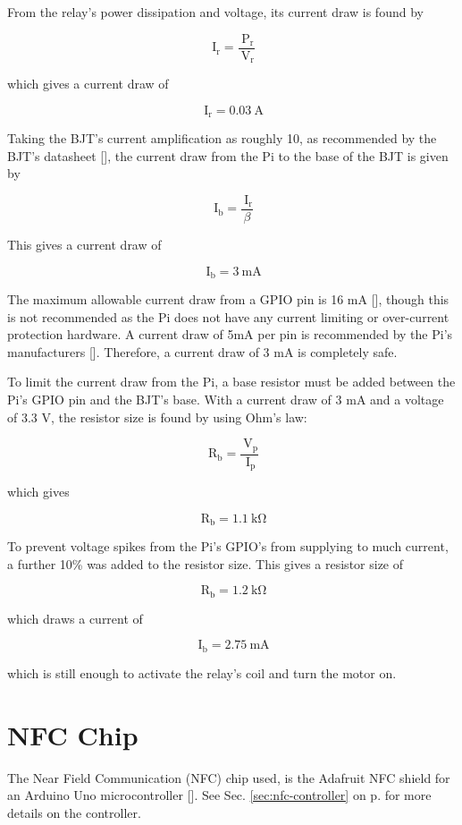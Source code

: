 From the relay's power dissipation and voltage, its current draw is found by

\[
\mathrm{\ I_{r}} = \frac{\mathrm{\ P_{r}}}{\mathrm{\ V_{r}}}
\]

which gives a current draw of

\[
\mathrm{\ I_{r}} = 0.03\mathrm{\ A}
\]

Taking the BJT's current amplification as roughly 10, as recommended by the
BJT's datasheet [\cite{maunual:transistor-datasheet}], the current draw from the
Pi to the base of the BJT is given by

\[
\mathrm{\ I_{b}} = \frac{\mathrm{\ I_{r}}}{\beta}
\]

This gives a current draw of

\[
\mathrm{\ I_{b}} = 3\mathrm{\ mA}
\]

The maximum allowable current draw from a GPIO pin is 16 mA
[\cite{website:gpio-specs}], though this is not recommended as the Pi does not
have any current limiting or over-current protection hardware. A current draw of 5mA per
pin is recommended by the Pi's manufacturers [\cite{website:gpio-specs}]. Therefore, a
current draw of 3 mA is completely safe.

To limit the current draw from the Pi, a base resistor must be added between the Pi's GPIO pin
and the BJT's base. With a current draw of 3 mA and a voltage of 3.3 V, the
resistor size is found by using Ohm's law:

\[
\mathrm{\ R_{b}} = \frac{\mathrm{\ V_{p}}}{\mathrm{\ I_{p}}}
\]

which gives

\[
\mathrm{\ R_{b}} = 1.1\mathrm{\ k\Omega}
\]

To prevent voltage spikes from the Pi's GPIO's from supplying to much current, a
further 10\% was added to the resistor size. This gives a resistor size of

\[\mathrm{\ R_{b}} = 1.2\mathrm{\ k\Omega}\]

which draws a current of 

\[\mathrm{\ I_{b}} = 2.75\mathrm{\ mA} \]

which is still enough to activate the relay's coil and turn the motor on. 

\section{NFC Chip}

The Near Field Communication (NFC) chip used, is the Adafruit NFC shield for an
Arduino Uno microcontroller [\cite{website:adafruit-nfc}]. See Sec.
\ref{sec:nfc-controller} on p.\pageref{sec:nfc-controller} for more details
on the controller.

